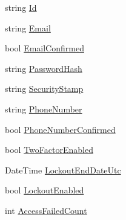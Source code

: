\begin{DoxyCompactItemize}
\item 
string \hyperlink{class_website_1_1_asp_net_users_a2c195fc5927d9592974ba250b28815e2}{Id}
\item 
string \hyperlink{class_website_1_1_asp_net_users_ab15b5817affddc4c49e8e9a9e044f636}{Email}
\item 
bool \hyperlink{class_website_1_1_asp_net_users_a2d1c56601271423ddfca2bdb0a4da378}{Email\+Confirmed}
\item 
string \hyperlink{class_website_1_1_asp_net_users_abf72faae7687011e33ef5b4c8a2f4889}{Password\+Hash}
\item 
string \hyperlink{class_website_1_1_asp_net_users_ad6ea9fb08bc75496821b61f7da9f5af6}{Security\+Stamp}
\item 
string \hyperlink{class_website_1_1_asp_net_users_aba86607f4f75287fc76623a22eb310ce}{Phone\+Number}
\item 
bool \hyperlink{class_website_1_1_asp_net_users_a9f97a6f8698167bbc0105c3f9867227e}{Phone\+Number\+Confirmed}
\item 
bool \hyperlink{class_website_1_1_asp_net_users_af672e585c81b55f9a37ed3b4816252d2}{Two\+Factor\+Enabled}
\item 
Date\+Time \hyperlink{class_website_1_1_asp_net_users_aac8b2b0cf2a3fce8b307c260e7e579ba}{Lockout\+End\+Date\+Utc}
\item 
bool \hyperlink{class_website_1_1_asp_net_users_a1fb370b8e88bf04a2375a371cf0790a8}{Lockout\+Enabled}
\item 
int \hyperlink{class_website_1_1_asp_net_users_a711c522cc00718e9be8479a9f35fef0f}{Access\+Failed\+Count}

\end{DoxyCompactItemize}
